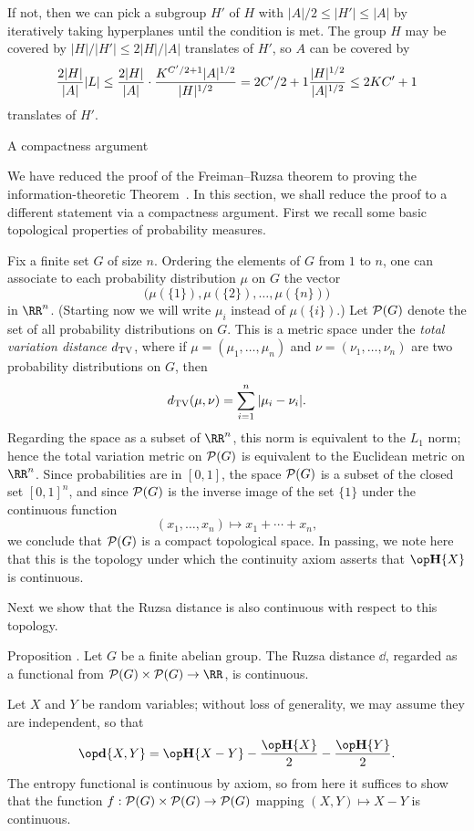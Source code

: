 If not, then we can pick a
subgroup $H'$ of $H$ with $|A|/2 \le |H'|\le |A|$ by iteratively taking hyperplanes until the condition is met.
The group $H$ may be covered by $|H|/|H'| \le 2|H|/|A|$ translates of $H'$, so $A$ can be covered by
$${2|H|\over |A|}|L| \le {2|H|\over |A|}\cdot {K^{C'/2+1}|A|^{1/2} \over |H|^{1/2} } 
= 2 {C'/2+1} {|H|^{1/2} \over |A|^{1/2}} \le 2K{C'+1}$$
translates of $H'$.\slug

\edef\sectcompactness{\the\sectcount}
\advsect A compactness argument

We have reduced the proof of the Freiman--Ruzsa theorem to proving the inform\-ation-theoretic
Theorem~{\thmsubgroup}. In this section, we shall reduce the proof to a different statement via a compactness
argument. First we recall some basic topological properties of probability measures.

Fix a finite set $G$ of size $n$. Ordering the elements of $G$ from $1$ to $n$, one can associate
to each probability distribution $\mu$ on $G$ the vector
$$\bigl( \mu(\{1\}), \mu(\{2\}), \ldots, \mu(\{n\})\bigr)$$
in $\RR^n$. (Starting now we will write $\mu_i$ instead of $\mu(\{i\})$.)
Let $\P(G)$ denote the set of all probability distributions on $G$.
This is a metric space under the {\it total variation
distance} $\dTV$, where if $\mu = (\mu_1,\ldots,\mu_n)$
and $\nu = (\nu_1,\ldots,\nu_n)$ are two probability distributions on $G$, then
$$\dTV(\mu,\nu) = \sum_{i=1}^n |\mu_i - \nu_i|.$$
Regarding the space as a subset of $\RR^n$, this norm is equivalent to the $L_1$ norm; hence
the total variation metric on $\P(G)$ is equivalent to the Euclidean metric on $\RR^n$.
Since probabilities are in $[0,1]$, the space $\P(G)$ is a subset of the closed set $[0,1]^n$,
and since $\P(G)$ is the inverse image of the set $\{1\}$ under the continuous function
$$(x_1,\ldots,x_n) \mapsto x_1 + \cdots + x_n,$$
we conclude that $\P(G)$ is a compact topological space. In passing, we note here that this is
the topology under which the continuity axiom asserts that $\Eta\{X\}$ is continuous.

Next we show that the Ruzsa distance is also continuous with respect to this topology.

\edef\propruzsacontinuous{\the\sectcount.\the\thmcount}
\proclaim Proposition \advthm. Let $G$ be a finite abelian group.
The Ruzsa distance $\dd$, regarded as a functional
from $\P(G)\times \P(G)\to \RR$, is continuous.

Let $X$ and $Y$ be random variables; without loss of generality, we may assume they are independent,
so that
$$\dd\{X,Y\} = \Eta\{X-Y\} - {\Eta\{X\} \over 2} - {\Eta\{Y\}\over 2}.$$
The entropy functional is continuous by axiom, so from here it suffices to show that
the function $f : \P(G)\times \P(G) \to \P(G)$ mapping $(X,Y)\mapsto X-Y$ is continuous.

